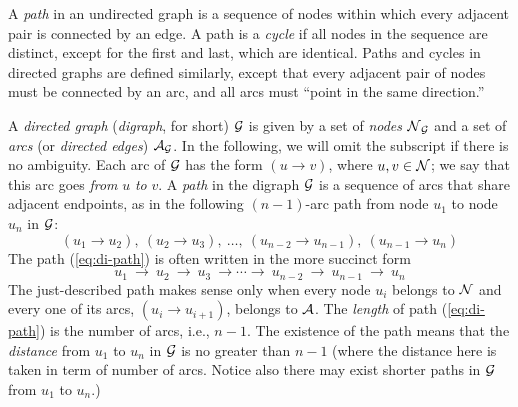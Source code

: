 A {\em path}   in
an undirected graph is a sequence of nodes within which every adjacent
pair is connected by an edge.  A path is a {\em cycle}
  if all nodes in the
sequence are distinct, except for the first and last, which are
identical.  Paths and cycles in directed graphs are defined similarly,
except that every adjacent pair of nodes must be connected by an arc,
and all arcs must ``point in the same direction.''
\bigskip

A {\it directed graph}  ({\it digraph},
 for short) $\mbox{$\cal G$}$ is given by a set of {\it nodes}
$\mbox{$\cal N$}_{\mbox{{\scriptsize $\cal G$}}}$ and a set of {\it arcs}
(or {\it directed edges}) $\mbox{$\cal A$}_{\mbox{{\scriptsize $\cal G$}}}$.
In the following, we will omit the subscript if there is no ambiguity.
Each arc of $\mbox{$\cal G$}$ has the form $(u \rightarrow v)$,
where $u, v \in \mbox{$\cal N$}$; we say that this arc goes {\em from} $u$
{\em to} $v$.  A {\it path} 
in the digraph $\mbox{$\cal G$}$ is a sequence of arcs that share adjacent
endpoints, as in the following $(n-1)$-arc path from node $u_1$ to
node $u_n$ in $\mbox{$\cal G$}$:
\begin{equation}
\label{eq:di-path}
(u_1 \rightarrow u_2), \ (u_2 \rightarrow u_3), \ \ldots, \ (u_{n-2}
        \rightarrow u_{n-1}), \ (u_{n-1} \rightarrow u_n)
\end{equation}
The path (\ref{eq:di-path}) is often written in the more succinct form
\[
u_1 \ \rightarrow \ u_2 \ \rightarrow \ u_3 \ \rightarrow \cdots
\rightarrow \ u_{n-2} \ \rightarrow \ u_{n-1} \ \rightarrow \ u_n
\]
The just-described path makes sense only when every node $u_i$ belongs
to $\mbox{$\cal N$}$ and every one of its arcs, $(u_i \rightarrow u_{i+1})$,
belongs to $\mbox{$\cal A$}$.  The {\it length} of path (\ref{eq:di-path}) is
the number of arcs, i.e., $n-1$.  The existence of the path means that
the {\it distance} 
  from
$u_1$ to $u_n$ in $\mbox{$\cal G$}$ is no greater than $n-1$ (where the distance here is taken in term of number of arcs.  
Notice also there may exist shorter paths in $\mbox{$\cal G$}$ from $u_1$ to $u_n$.)
\bigskip

\noindent {}
\bigskip

